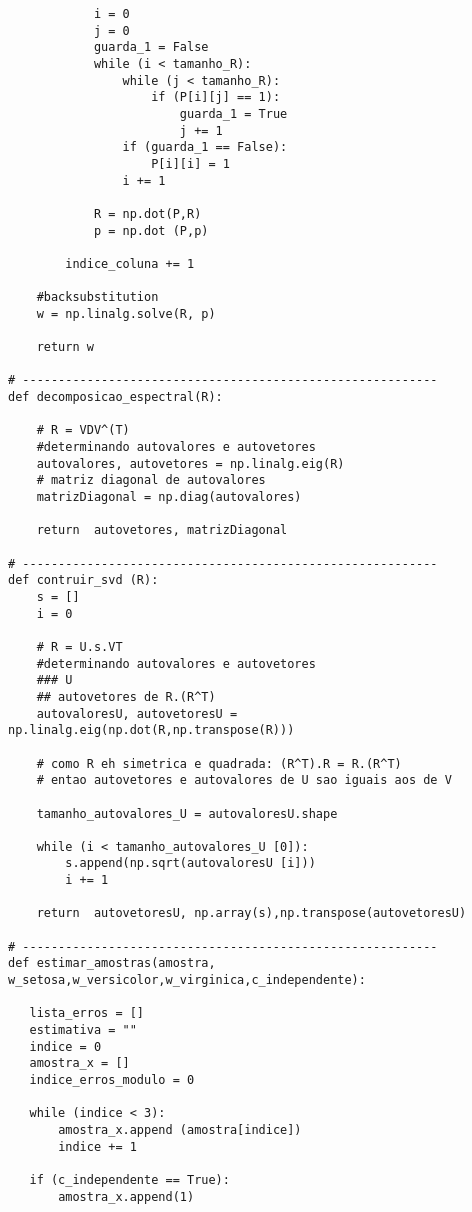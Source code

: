 \documentclass[a4paper,12pt,twoside]{article}
\begin{document}
\begin{lstlisting}
            i = 0
            j = 0
            guarda_1 = False
            while (i < tamanho_R):
                while (j < tamanho_R):
                    if (P[i][j] == 1):
                        guarda_1 = True
                        j += 1
                if (guarda_1 == False):
                    P[i][i] = 1
                i += 1
            
            R = np.dot(P,R)
            p = np.dot (P,p)
       
        indice_coluna += 1 
    
    #backsubstitution
    w = np.linalg.solve(R, p)
      
    return w
           
# ----------------------------------------------------------
def decomposicao_espectral(R):
    
    # R = VDV^(T)
    #determinando autovalores e autovetores
    autovalores, autovetores = np.linalg.eig(R) 
    # matriz diagonal de autovalores
    matrizDiagonal = np.diag(autovalores) 
        
    return  autovetores, matrizDiagonal

# ----------------------------------------------------------
def contruir_svd (R):
    s = []
    i = 0
 
    # R = U.s.VT
    #determinando autovalores e autovetores
    ### U
    ## autovetores de R.(R^T)
    autovaloresU, autovetoresU = np.linalg.eig(np.dot(R,np.transpose(R)))
    
    # como R eh simetrica e quadrada: (R^T).R = R.(R^T)
    # entao autovetores e autovalores de U sao iguais aos de V
    
    tamanho_autovalores_U = autovaloresU.shape
      
    while (i < tamanho_autovalores_U [0]):       
        s.append(np.sqrt(autovaloresU [i]))
        i += 1
    
    return  autovetoresU, np.array(s),np.transpose(autovetoresU)

# ----------------------------------------------------------
def estimar_amostras(amostra, w_setosa,w_versicolor,w_virginica,c_independente):
    
   lista_erros = []
   estimativa = ""
   indice = 0
   amostra_x = []
   indice_erros_modulo = 0
   
   while (indice < 3):
       amostra_x.append (amostra[indice])
       indice += 1
       
   if (c_independente == True):
       amostra_x.append(1)
      

\end{lstlisting}
\end{document}
